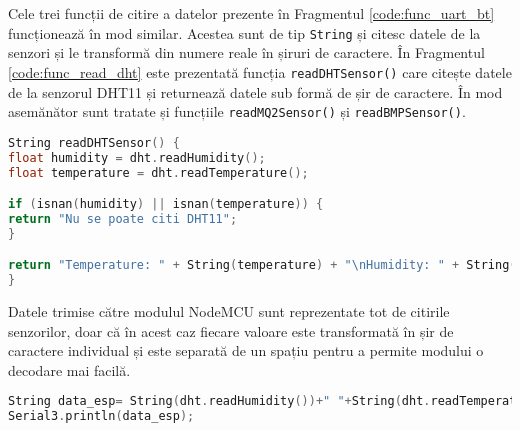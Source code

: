Cele trei funcții de citire a datelor prezente în Fragmentul \ref{code:func_uart_bt} funcționează în mod similar. Acestea sunt de tip \texttt{String} și citesc datele de la senzori și le transformă din numere reale în șiruri de caractere. În Fragmentul \ref{code:func_read_dht} este prezentată funcția \texttt{readDHTSensor()} care citește datele de la senzorul DHT11 și returnează datele sub formă de șir de caractere. În mod asemănător sunt tratate și funcțiile \texttt{readMQ2Sensor()} și \texttt{readBMPSensor()}.

\begin{code}[H]
\begin{lstlisting}[language=C++]
String readDHTSensor() {
float humidity = dht.readHumidity();
float temperature = dht.readTemperature();

if (isnan(humidity) || isnan(temperature)) {
return "Nu se poate citi DHT11";
}

return "Temperature: " + String(temperature) + "\nHumidity: " + String(humidity);
}
\end{lstlisting}
\caption{Funcția de citire a datelor de la senzorul DHT11 și transformarea acestora în șiruri de caractere}
\label{code:func_read_dht}
\end{code}

Datele trimise către modulul NodeMCU sunt reprezentate tot de citirile senzorilor, doar că în acest caz fiecare valoare este transformată în șir de caractere individual și este separată de un spațiu pentru a permite modului o decodare mai facilă.

\begin{code}[H]
\begin{lstlisting}[language=C++]
String data_esp= String(dht.readHumidity())+" "+String(dht.readTemperature())+" "+String(mq2.readCO()*(5/1023.0))+" "+String(mq2.readLPG()*(5/1023.0))+" "+String(mq2.readSmoke()*(5/1023.0))+" "+String(bmp.readAltitude(1020))+" "+String(bmp.readPressure()* 0.000145038);
Serial3.println(data_esp);
\end{lstlisting}
\caption{Trimiterea serială a datelor către modulul NodeMCU}
\label{code:func_uart_esp}
\end{code}